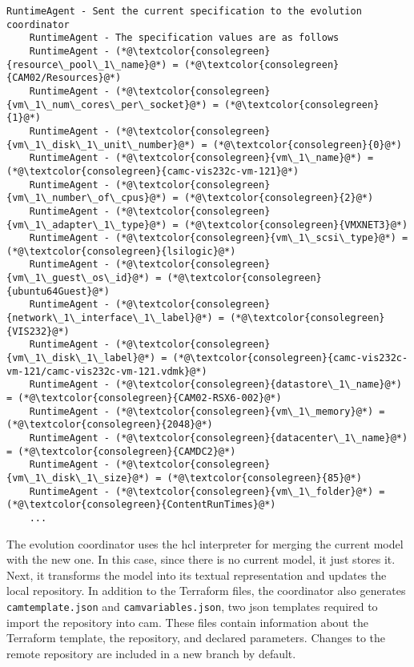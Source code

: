 \begin{mdframed}[style=consolestyle]
	\vspace{0.3em}
	\begin{lstlisting}[style=console]
	RuntimeAgent - Sent the current specification to the evolution coordinator
	RuntimeAgent - The specification values are as follows
	RuntimeAgent - (*@\textcolor{consolegreen}{resource\_pool\_1\_name}@*) = (*@\textcolor{consolegreen}{CAM02/Resources}@*)
	RuntimeAgent - (*@\textcolor{consolegreen}{vm\_1\_num\_cores\_per\_socket}@*) = (*@\textcolor{consolegreen}{1}@*)
	RuntimeAgent - (*@\textcolor{consolegreen}{vm\_1\_disk\_1\_unit\_number}@*) = (*@\textcolor{consolegreen}{0}@*)
	RuntimeAgent - (*@\textcolor{consolegreen}{vm\_1\_name}@*) = (*@\textcolor{consolegreen}{camc-vis232c-vm-121}@*)
	RuntimeAgent - (*@\textcolor{consolegreen}{vm\_1\_number\_of\_cpus}@*) = (*@\textcolor{consolegreen}{2}@*)
	RuntimeAgent - (*@\textcolor{consolegreen}{vm\_1\_adapter\_1\_type}@*) = (*@\textcolor{consolegreen}{VMXNET3}@*)
	RuntimeAgent - (*@\textcolor{consolegreen}{vm\_1\_scsi\_type}@*) = (*@\textcolor{consolegreen}{lsilogic}@*)
	RuntimeAgent - (*@\textcolor{consolegreen}{vm\_1\_guest\_os\_id}@*) = (*@\textcolor{consolegreen}{ubuntu64Guest}@*)
	RuntimeAgent - (*@\textcolor{consolegreen}{network\_1\_interface\_1\_label}@*) = (*@\textcolor{consolegreen}{VIS232}@*)
	RuntimeAgent - (*@\textcolor{consolegreen}{vm\_1\_disk\_1\_label}@*) = (*@\textcolor{consolegreen}{camc-vis232c-vm-121/camc-vis232c-vm-121.vdmk}@*)
	RuntimeAgent - (*@\textcolor{consolegreen}{datastore\_1\_name}@*) = (*@\textcolor{consolegreen}{CAM02-RSX6-002}@*)
	RuntimeAgent - (*@\textcolor{consolegreen}{vm\_1\_memory}@*) = (*@\textcolor{consolegreen}{2048}@*)
	RuntimeAgent - (*@\textcolor{consolegreen}{datacenter\_1\_name}@*) = (*@\textcolor{consolegreen}{CAMDC2}@*)
	RuntimeAgent - (*@\textcolor{consolegreen}{vm\_1\_disk\_1\_size}@*) = (*@\textcolor{consolegreen}{85}@*)
	RuntimeAgent - (*@\textcolor{consolegreen}{vm\_1\_folder}@*) = (*@\textcolor{consolegreen}{ContentRunTimes}@*)
	...
	\end{lstlisting}
	\vspace{-0.3em}
\end{mdframed}

The evolution coordinator uses the \gls{hcl} interpreter for merging the current model with the new one. In this case, since there is no current model, it just stores it. Next, it transforms the model into its textual representation and updates the local repository. In addition to the Terraform files, the coordinator also generates \texttt{camtemplate.json} and \texttt{camvariables.json}, two \acrshort{json} templates required to import the repository into \gls{cam}. These files contain information about the Terraform template, the repository, and declared parameters. Changes to the remote repository are included in a new branch by default.

